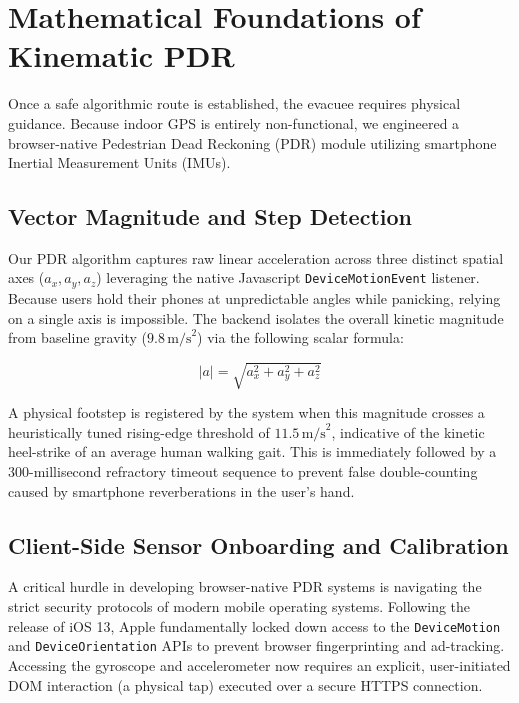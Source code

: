 \documentclass[conference]{IEEEtran}
\begin{document}
\section{Mathematical Foundations of Kinematic PDR}

Once a safe algorithmic route is established, the evacuee requires physical guidance. Because indoor
GPS is entirely non-functional, we engineered a browser-native Pedestrian Dead Reckoning (PDR)
module utilizing smartphone Inertial Measurement Units (IMUs).

\subsection{Vector Magnitude and Step Detection}
Our PDR algorithm captures raw linear acceleration across three distinct spatial axes ($a_x, a_y,
a_z$) leveraging the native Javascript \texttt{DeviceMotionEvent} listener. Because users hold their
phones at unpredictable angles while panicking, relying on a single axis is impossible. The backend
isolates the overall kinetic magnitude from baseline gravity ($9.8 \, \text{m/s}^2$) via the
following scalar formula:

\begin{equation}
    |a| = \sqrt{a_x^2 + a_y^2 + a_z^2}
\end{equation}

A physical footstep is registered by the system when this magnitude crosses a heuristically tuned
rising-edge threshold of $11.5 \, \text{m/s}^2$, indicative of the kinetic heel-strike of an average
human walking gait. This is immediately followed by a 300-millisecond refractory timeout sequence to
prevent false double-counting caused by smartphone reverberations in the user's hand.

\subsection{Client-Side Sensor Onboarding and Calibration}
A critical hurdle in developing browser-native PDR systems is navigating the strict security
protocols of modern mobile operating systems. Following the release of iOS 13, Apple fundamentally
locked down access to the \texttt{DeviceMotion} and \texttt{DeviceOrientation} APIs to prevent
browser fingerprinting and ad-tracking. Accessing the gyroscope and accelerometer now requires an
explicit, user-initiated DOM interaction (a physical tap) executed over a secure HTTPS connection.
\end{document}

